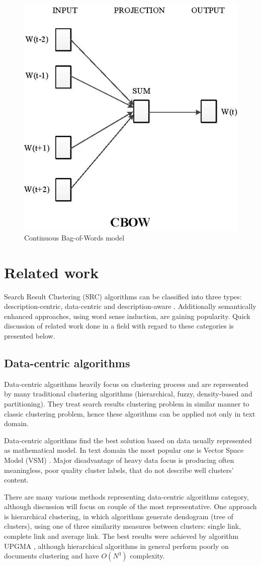 \documentclass[a4paper, 12pt, oneside]{Thesis} %
\begin{document}
\begin{figure}[h]
  \centering
  \includegraphics[width=.5\linewidth]{Figures/cbow.png}
  \caption{Continuous Bag-of-Words model}
  \label{fig:cbow}
\end{figure}

\chapter{Related work} Search Result Clustering (SRC) algorithms can be classified into three types: description-centric, data-centric and description-aware \cite{carpineto2009survey}. Additionally semantically enhanced approaches, using word sense induction, are gaining popularity. Quick discussion of related work done in a field with regard to these categories is presented below.

\section{Data-centric algorithms} Data-centric algorithms heavily focus on clustering process and are represented by many traditional clustering algorithms (hierarchical, fuzzy, density-based and partitioning). They treat search results clustering problem in similar manner to classic clustering problem, hence these algorithms can be applied not only in text domain. 

Data-centric algorithms find the best solution based on data usually represented as mathematical model. In text domain the most popular one is Vector Space Model (VSM) \cite{salton1975vector}. Major disadvantage of heavy data focus is producing often meaningless, poor quality cluster labels, that do not describe well clusters' content.

There are many various methods representing data-centric algorithms category, although discussion will focus on couple of the most representative. One approach is hierarchical clustering, in which algorithms generate dendogram (tree of clusters), using one of three similarity measures between clusters: single link, complete link and average link. The best results were achieved by algorithm UPGMA \cite{jain1988algorithms}, although hierarchical algorithms in general perform poorly on documents clustering and have $O(N^3)$ complexity. 
\end{document}

